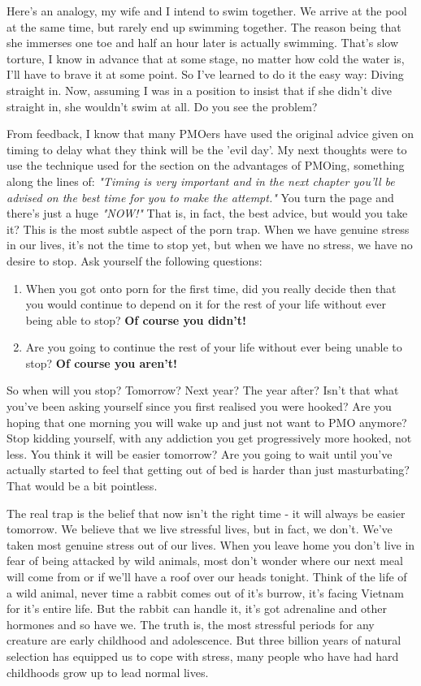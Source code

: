 \documentclass[easypeasy.tex]{subfiles}
\begin{document}
Here's an analogy, my wife and I intend to swim together. We arrive at the pool at the same time, but rarely end up swimming together. The reason being that she immerses one toe and half an hour later is actually swimming. That's slow torture, I know in advance that at some stage, no matter how cold the water is, I'll have to brave it at some point. So I've learned to do it the easy way: Diving straight in. Now, assuming I was in a position to insist that if she didn't dive straight in, she wouldn't swim at all. Do you see the problem?

From feedback, I know that many PMOers have used the original advice given on timing to delay what they think will be the 'evil day'. My next thoughts were to use the technique used for the section on the advantages of PMOing, something along the lines of: \textit{"Timing is very important and in the next chapter you'll be advised on the best time for you to make the attempt."} You turn the page and there's just a huge \textit{"NOW!"} That is, in fact, the best advice, but would you take it? This is the most subtle aspect of the porn trap. When we have genuine stress in our lives, it's not the time to stop yet, but when we have no stress, we have no desire to stop. Ask yourself the following questions:

\begin{enumerate}
  \item When you got onto porn for the first time, did you really decide then that you would continue to depend on it for the rest of your life without ever being able to stop? \textbf{Of course you didn't!}

  \item Are you going to continue the rest of your life without ever being unable to stop? \textbf{Of course you aren't!}
  \end{enumerate}

So when will you stop? Tomorrow? Next year? The year after? Isn't that what you've been asking yourself since you first realised you were hooked? Are you hoping that one morning you will wake up and just not want to PMO anymore? Stop kidding yourself, with any addiction you get progressively more hooked, not less. You think it will be easier tomorrow? Are you going to wait until you've actually started to feel that getting out of bed is harder than just masturbating? That would be a bit pointless.

The real trap is the belief that now isn't the right time - it will always be easier tomorrow. We believe that we live stressful lives, but in fact, we don't. We've taken most genuine stress out of our lives. When you leave home you don't live in fear of being attacked by wild animals, most don't wonder where our next meal will come from or if we'll have a roof over our heads tonight. Think of the life of a wild animal, never time a rabbit comes out of it's burrow, it's facing Vietnam for it's entire life. But the rabbit can handle it, it's got adrenaline and other hormones and so have we. The truth is, the most stressful periods for any creature are early childhood and adolescence. But three billion years of natural selection has equipped us to cope with stress, many people who have had hard childhoods grow up to lead normal lives.
\end{document}
